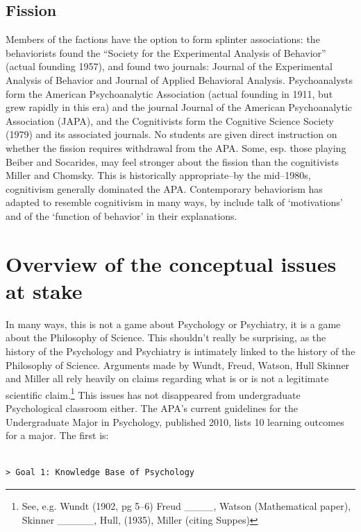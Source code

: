 \subsection{Fission}
\label{fission}

Members of the factions have the option to form splinter associations: the behaviorists found the “Society for the Experimental Analysis of Behavior” (actual founding 1957), and found two journals: Journal of the Experimental Analysis of Behavior and Journal of Applied Behavioral Analysis. Psychoanalysts form the American Psychoanalytic Association (actual founding in 1911, but grew rapidly in this era) and the journal Journal of the American Psychoanalytic Association (JAPA), and the Cognitivists form the Cognitive Science Society (1979) and its associated journals.
No students are given direct instruction on whether the fission requires withdrawal from the APA. Some, esp. those playing Beiber and Socarides, may feel stronger about the fission than the cognitivists Miller and Chomsky. This is historically appropriate–by the mid--1980s, cognitivism generally dominated the APA. Contemporary behaviorism has adapted to resemble cognitivism in many ways, by include talk of `motivations' and of the `function of behavior' in their explanations.

\section{Overview of the conceptual issues at stake}
\label{overviewoftheconceptualissuesatstake}

In many ways, this is not a game about Psychology or Psychiatry, it is a game about the Philosophy of Science. This shouldn't really be surprising, as the history of the Psychology and Psychiatry is intimately linked to the history of the Philosophy of Science. Arguments made by Wundt, Freud, Watson, Hull Skinner and Miller all rely heavily on claims regarding what is or is not a legitimate scientific claim.\footnote{See, e.g. Wundt (1902, pg 5--6) Freud \_\_\_\_, Watson (Mathematical paper), Skinner \_\_\_\_\_, Hull, (1935), Miller (citing Suppes)} This issues has not disappeared from undergraduate Psychological classroom either. The APA's current guidelines for the Undergraduate Major in Psychology, published 2010, lists 10 learning outcomes for a major. The first is:

\begin{adjustwidth}{2.5em}{2.5em}
\begin{verbatim}

> Goal 1: Knowledge Base of Psychology

\end{verbatim}
\end{adjustwidth}

